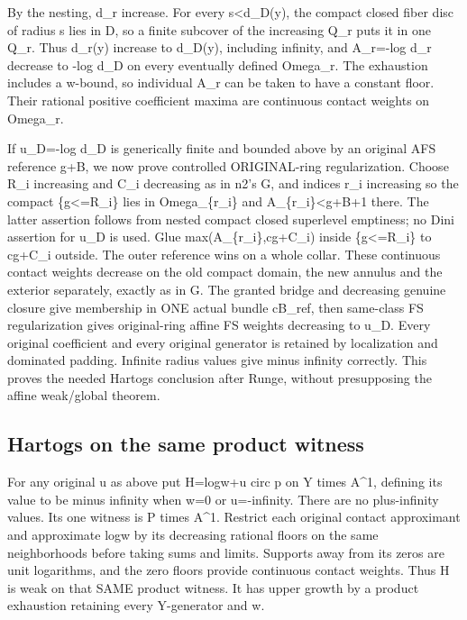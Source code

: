 \documentclass[
  10pt,
]{article}
\begin{document}
By the nesting, d\_r increase. For every s\textless d\_D(y), the compact
closed fiber disc of radius s lies in D, so a finite subcover of the
increasing Q\_r puts it in one Q\_r. Thus d\_r(y) increase to d\_D(y),
including infinity, and A\_r=-log d\_r decrease to -log d\_D on every
eventually defined Omega\_r. The exhaustion includes a w-bound, so
individual A\_r can be taken to have a constant floor. Their rational
positive coefficient maxima are continuous contact weights on Omega\_r.

If u\_D=-log d\_D is generically finite and bounded above by an original
AFS reference g+B, we now prove controlled ORIGINAL-ring regularization.
Choose R\_i increasing and C\_i decreasing as in n2's G, and indices
r\_i increasing so the compact \{g\textless=R\_i\} lies in
Omega\_\{r\_i\} and A\_\{r\_i\}\textless g+B+1 there. The latter
assertion follows from nested compact closed superlevel emptiness; no
Dini assertion for u\_D is used. Glue max(A\_\{r\_i\},cg+C\_i) inside
\{g\textless=R\_i\} to cg+C\_i outside. The outer reference wins on a
whole collar. These continuous contact weights decrease on the old
compact domain, the new annulus and the exterior separately, exactly as
in G. The granted bridge and decreasing genuine closure give membership
in ONE actual bundle cB\_ref, then same-class FS regularization gives
original-ring affine FS weights decreasing to u\_D. Every original
coefficient and every original generator is retained by localization and
dominated padding. Infinite radius values give minus infinity correctly.
This proves the needed Hartogs conclusion after Runge, without
presupposing the affine weak/global theorem.

\subsection{Hartogs on the same product
witness}\label{hartogs-on-the-same-product-witness}

For any original u as above put H=log\textbar w\textbar+u circ p on Y
times A\^{}1, defining its value to be minus infinity when w=0 or
u=-infinity. There are no plus-infinity values. Its one witness is P
times A\^{}1. Restrict each original contact approximant and approximate
log\textbar w\textbar{} by its decreasing rational floors on the same
neighborhoods before taking sums and limits. Supports away from its
zeros are unit logarithms, and the zero floors provide continuous
contact weights. Thus H is weak on that SAME product witness. It has
upper growth by a product exhaustion retaining every Y-generator and w.
\end{document}
